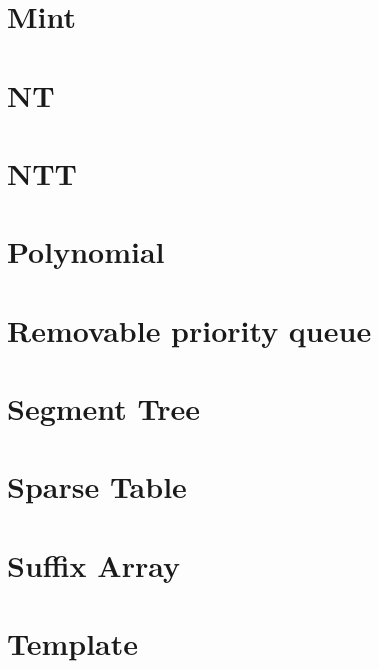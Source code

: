 \documentclass{article}
\begin{document}
\section{Mint}


\section{NT}


\section{NTT}


\section{Polynomial}


\section{Removable priority queue}


\section{Segment Tree}


\section{Sparse Table}


\section{Suffix Array}


\section{Template}

\end{document}
